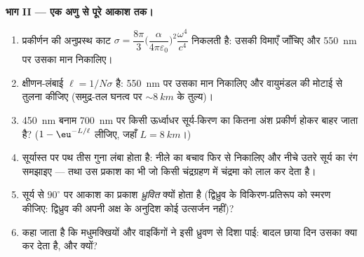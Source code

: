 \begin{problem}
\medskip\noindent\textbf{भाग II --- एक अणु से पूरे
आकाश तक।}
\begin{enumerate}[resume]
  \item प्रकीर्णन की अनुप्रस्थ काट $\sigma =
        \dfrac{8\pi}{3}\Big(\dfrac{\alpha}{4\pi\varepsilon_0}
        \Big)^2\dfrac{\omega^4}{c^4}$ निकलती है: उसकी विमाएँ जाँचिए
        और \qty{550}{nm} पर उसका मान निकालिए।
  \item क्षीणन-लंबाई $\ell = 1/N\sigma$ है: \qty{550}{nm} पर उसका
        मान निकालिए और वायुमंडल की मोटाई से तुलना कीजिए
        (समुद्र-तल घनत्व पर $\sim\qty{8}{km}$ के तुल्य)।
  \item \qty{450}{nm} बनाम \qty{700}{nm} पर किसी ऊर्ध्वाधर
        सूर्य-किरण का कितना अंश प्रकीर्ण होकर बाहर जाता है?
        ($1 -
        \eu^{-L/\ell}$ लीजिए, जहाँ $L = \qty{8}{km}$।)
  \item सूर्यास्त पर पथ तीस गुना लंबा होता है: नीले का बचाव फिर से
        निकालिए और नीचे उतरे सूर्य का रंग समझाइए ---
        तथा उस प्रकाश का भी जो किसी चंद्रग्रहण में चंद्रमा को लाल कर
        देता है।
  \item सूर्य से $90^\circ$ पर आकाश का प्रकाश \emph{ध्रुवित} क्यों
        होता है (द्विध्रुव के विकिरण-प्रतिरूप को स्मरण कीजिए:
        द्विध्रुव की अपनी अक्ष के अनुदिश कोई उत्सर्जन नहीं)?
  \item कहा जाता है कि मधुमक्खियों और वाइकिंगों ने इसी ध्रुवण से
        दिशा पाई: बादल छाया दिन उसका क्या कर देता है, और
        क्यों?
\end{enumerate}


\end{problem}
